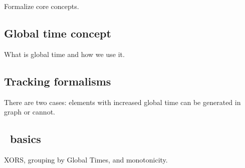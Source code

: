 \label {fs-acker-design}

Formalize core concepts.

\subsection{Global time concept}
What is global time and how we use it.

\subsection{Tracking formalisms}
There are two cases: elements with increased global time can be generated in graph or cannot.

\subsection{\tracker\ basics}
XORS, grouping by Global Times, and monotonicity. 


